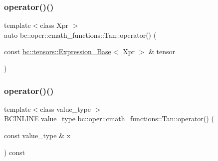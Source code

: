 \mbox{\label{structbc_1_1oper_1_1cmath__functions_1_1Tan_aa3174f39838e9ef3c0c05c095956f129}} 
\subsubsection{\texorpdfstring{operator()()}{operator()()}\hspace{0.1cm}{\footnotesize\ttfamily [2/3]}}
{\footnotesize\ttfamily template$<$class Xpr $>$ \\
auto bc\+::oper\+::cmath\+\_\+functions\+::\+Tan\+::operator() (\begin{DoxyParamCaption}\item[{const \hyperlink{classbc_1_1tensors_1_1Expression__Base}{bc\+::tensors\+::\+Expression\+\_\+\+Base}$<$ Xpr $>$ \&}]{tensor }\end{DoxyParamCaption})\hspace{0.3cm}{\ttfamily [inline]}}

\mbox{\label{structbc_1_1oper_1_1cmath__functions_1_1Tan_a45cc3c54fc8492269e08be72e678e774}} 
\subsubsection{\texorpdfstring{operator()()}{operator()()}\hspace{0.1cm}{\footnotesize\ttfamily [3/3]}}
{\footnotesize\ttfamily template$<$class value\+\_\+type $>$ \\
\hyperlink{common_8h_a6699e8b0449da5c0fafb878e59c1d4b1}{B\+C\+I\+N\+L\+I\+NE} value\+\_\+type bc\+::oper\+::cmath\+\_\+functions\+::\+Tan\+::operator() (\begin{DoxyParamCaption}\item[{const value\+\_\+type \&}]{x }\end{DoxyParamCaption}) const\hspace{0.3cm}{\ttfamily [inline]}}



